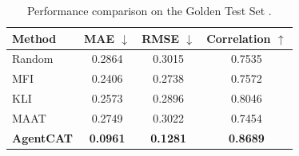 \begin{table}[htbp]
    \centering
    \caption{Performance comparison on the Golden Test Set . }
    \label{tab:counterfactual_results}
    \renewcommand{\arraystretch}{1.1} %
    \setlength{\tabcolsep}{4mm} %
    
    \begin{tabular}{l c c c}
        \toprule
        \textbf{Method} & \textbf{MAE} $\downarrow$ & \textbf{RMSE} $\downarrow$ & \textbf{Correlation} $\uparrow$ \\
        \midrule
        Random   & 0.2864 & 0.3015 & 0.7535 \\
        MFI      & 0.2406 & 0.2738 & 0.7572 \\
        KLI      & 0.2573 & 0.2896 & 0.8046 \\
        MAAT     & 0.2749 & 0.3022 & 0.7454 \\
        \midrule
        \textbf{AgentCAT} & \textbf{0.0961} & \textbf{0.1281} & \textbf{0.8689} \\
        \bottomrule
    \end{tabular}


\end{table}